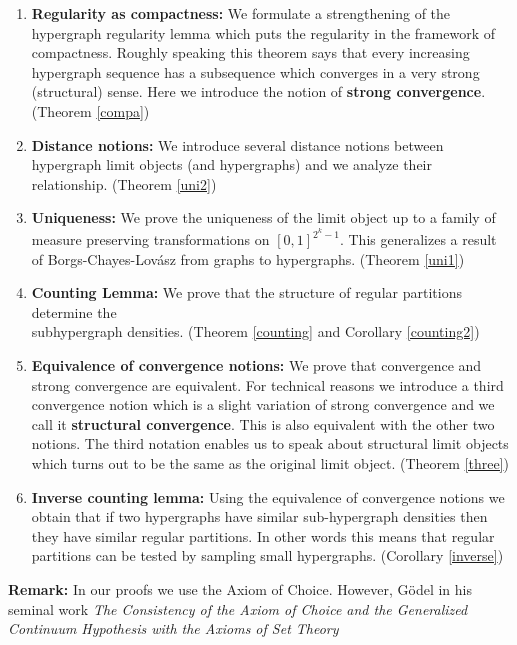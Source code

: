 \documentclass [11pt] {article}
\begin{document}
\begin{enumerate}
\item {\bf Regularity as compactness:} We formulate a strengthening of the
  hypergraph regularity lemma which puts the regularity in the framework of
  compactness.
 Roughly speaking this theorem says that every increasing hypergraph sequence
 has a subsequence which converges in a very strong (structural) sense. 
 Here we introduce the notion of {\bf strong convergence}. (Theorem
 \ref{compa})

    
\item {\bf Distance notions:} We introduce several distance notions between
 hypergraph limit objects (and hypergraphs) and we analyze their relationship.
(Theorem \ref{uni2})

\item {\bf Uniqueness:} We prove the uniqueness of the limit object up to a
 family of measure preserving transformations on $[0,1]^{2^k-1}$. 
This generalizes a result of Borgs-Chayes-Lov\'asz from graphs to hypergraphs.
(Theorem \ref{uni1})
    
\item {\bf Counting Lemma:} We prove that the structure of 
regular partitions determine the \\ 
subhypergraph densities. (Theorem \ref{counting} and Corollary \ref{counting2})
    
\item {\bf Equivalence of convergence notions:} We prove 
that convergence and strong convergence are equivalent.
 For technical reasons we introduce a third convergence 
notion which is a slight variation of strong convergence and we call it {\bf
  structural convergence}. This is also equivalent with the other two
notions. 
The third notation enables us to speak about structural 
limit objects which turns out to be the same as the original limit object.
(Theorem \ref{three})
    
\item {\bf Inverse counting lemma:} Using the equivalence of 
convergence notions we obtain that if two hypergraphs have similar 
sub-hypergraph densities then they have similar regular partitions. 
In other words this means that regular partitions can be tested by 
sampling small hypergraphs. (Corollary \ref{inverse})
     
\end{enumerate}
{\bf Remark:} In our proofs we use the Axiom of Choice. However, G\"odel
in his seminal work {\it The Consistency of the Axiom of Choice
and the Generalized Continuum Hypothesis with the Axioms of Set Theory}
\end{document}
